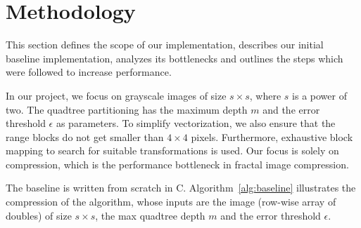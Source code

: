 \section{Methodology}\label{sec:yourmethod}

This section defines the scope of our implementation, describes our initial baseline
implementation, analyzes its bottlenecks and outlines the steps which were followed to
increase performance.

 In our project, we focus on grayscale images of size $s \times s$,
where $s$ is a power of two. The quadtree partitioning has the maximum depth $m$
and the error threshold $\epsilon$ as parameters. To simplify vectorization, we
also ensure that the range blocks do not get smaller than $4 \times 4$ pixels.
Furthermore, exhaustive block mapping to search for suitable transformations is
used. Our focus is solely on compression, which is the performance bottleneck in
fractal image compression.

The baseline is written from scratch in C. Algorithm~\ref{alg:baseline} illustrates the compression of the algorithm,
whose inputs are the image (row-wise array of doubles) of size $s \times s$, the max quadtree depth $m$ and the error threshold $\epsilon$.

